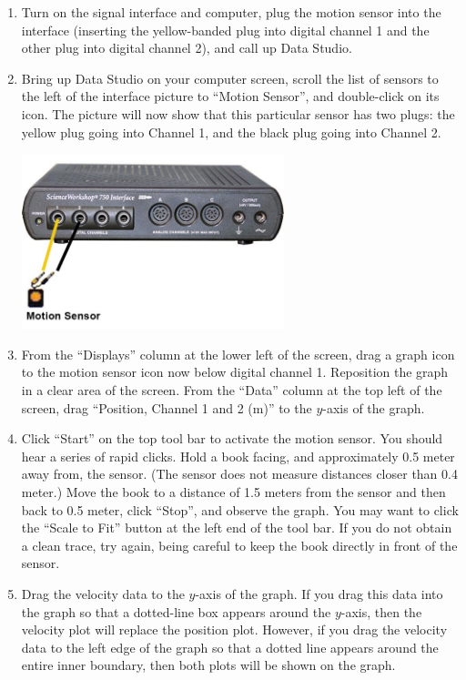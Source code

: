 \begin{enumerate}[label=\arabic*.]

\item Turn on the signal interface and computer, plug the motion sensor into the interface (inserting the yellow-banded plug into digital channel 1 and the other plug into digital channel 2), and call up Data Studio.

\item Bring up Data Studio on your computer screen, scroll the list of sensors to the left of the interface picture to ``Motion Sensor'', and double-click on its icon.  The picture will now show that this particular sensor has two plugs: the yellow plug going into Channel 1, and the black plug going into Channel 2.
\begin{center} \includegraphics*[width=0.6\textwidth]{imgs/6labs/6Alab/6Aexp2/6A-exp2_fig2_new.jpg} \end{center}

\item From the ``Displays'' column at the lower left of the screen, drag a graph icon to the motion sensor icon now below digital channel 1.  Reposition the graph in a clear area of the screen.  From the ``Data'' column at the top left of the screen, drag ``Position, Channel 1 and 2 (m)'' to the \(y\)-axis of the graph.

\item Click ``Start'' on the top tool bar to activate the motion sensor.  You should hear a series of rapid clicks.  Hold a book facing, and approximately 0.5 meter away from, the sensor.  (The sensor does not measure distances closer than 0.4 meter.)  Move the book to a distance of 1.5 meters from the sensor and then back to 0.5 meter, click ``Stop'', and observe the graph.  You may want to click the ``Scale to Fit'' button at the left end of the tool bar.  If you do not obtain a clean trace, try again, being careful to keep the book directly in front of the sensor.

\item Drag the velocity data to the \(y\)-axis of the graph.  If you drag this data into the graph so that a dotted-line box appears around the \(y\)-axis, then the velocity plot will replace the position plot.  However, if you drag the velocity data to the left edge of the graph so that a dotted line appears around the entire inner boundary, then both plots will be shown on the graph.


\end{enumerate}
